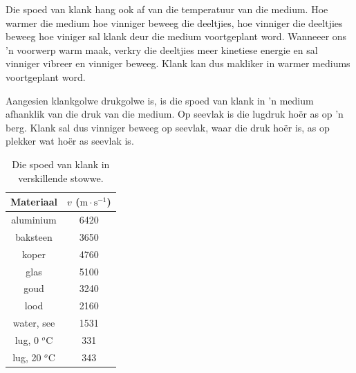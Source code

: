 
\begin{minipage}[t]{.5\textwidth}
Die spoed van klank hang ook af van die temperatuur van die medium. Hoe warmer die medium hoe vinniger beweeg die deeltjies, hoe vinniger die deeltjies beweeg hoe viniger sal klank deur die medium voortgeplant word. Wanneeer ons 'n voorwerp warm maak, verkry die deeltjies meer kinetiese energie en sal vinniger vibreer en vinniger beweeg. Klank kan dus makliker in warmer mediums voortgeplant word.\par  

Aangesien klankgolwe drukgolwe is, is die spoed van klank in 'n medium afhanklik van die druk van die medium. Op seevlak is die lugdruk ho\"{e}r as op 'n berg. Klank sal dus vinniger beweeg op seevlak, waar die druk ho\"{e}r is, as op plekker wat ho\"{e}r as seevlak is.  
\end{minipage}
\begin{minipage}[t]{.5\textwidth}
\begin{center}
\begin{table}[H]
\centering
 \begin{tabular}{|c|c|}\hline
Materiaal	& $v$ ($\text{m}\cdot \text{s}^{-1}$)\\ \hline \hline
aluminium	&6420 \\ \hline
baksteen	&3650 \\ \hline
koper	&4760	 	 \\ \hline
glas &5100	 \\ \hline 	 	 
goud	&3240	 \\ \hline 	
lood	&2160	 \\ \hline 
water, see	&1531 \\ \hline
lug, 0 $^o$C&331 \\ \hline
lug, 20 $^o$C&343 \\ \hline
\end{tabular}
\caption{Die spoed van klank in verskillende stowwe.}
\end{table}
\end{center}
\end{minipage}

